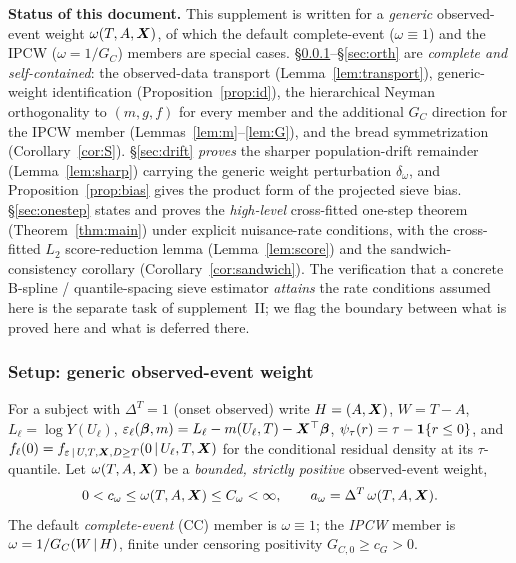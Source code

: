 

\noindent\textbf{Status of this document.} This supplement is written for a
\emph{generic} observed-event weight $\omega(T,A,\bm{X})$, of which the default
complete-event ($\omega\equiv1$) and the IPCW ($\omega=1/G_C$) members are
special cases. \S\ref{sec:setup}--\S\ref{sec:orth} are \emph{complete and
self-contained}: the observed-data transport (Lemma~\ref{lem:transport}),
generic-weight identification (Proposition~\ref{prop:id}), the hierarchical
Neyman orthogonality to $(m,g,f)$ for every member and the additional $G_C$
direction for the IPCW member (Lemmas~\ref{lem:m}--\ref{lem:G}), and the bread
symmetrization (Corollary~\ref{cor:S}). \S\ref{sec:drift} \emph{proves} the
sharper population-drift remainder (Lemma~\ref{lem:sharp}) carrying the generic
weight perturbation $\delta_\omega$, and Proposition~\ref{prop:bias} gives the
product form of the projected sieve bias. \S\ref{sec:onestep} states and proves
the \emph{high-level} cross-fitted one-step theorem (Theorem~\ref{thm:main})
under explicit nuisance-rate conditions, with the cross-fitted $L_2$
score-reduction lemma (Lemma~\ref{lem:score}) and the sandwich-consistency
corollary (Corollary~\ref{cor:sandwich}). The verification that a concrete
B-spline / quantile-spacing sieve estimator \emph{attains} the rate conditions
assumed here is the separate task of supplement~II; we flag the boundary between
what is proved here and what is deferred there.

\subsubsection{Setup: generic observed-event weight}\label{sec:setup}
For a subject with $\Delta^T=1$ (onset observed) write $H=(A,\bm{X})$, $W=T-A$,
$L_\ell=\log Y(U_\ell)$, $\varepsilon_\ell(\bm{\beta},m)=L_\ell-m(U_\ell,T)
-\bm{X}^\top\bm{\beta}$, $\psi_\tau(r)=\tau-\mathbf{1}\{r\le0\}$, and
$f_\ell(0)=f_{\varepsilon\,\vert\, U,T,\bm{X},D\ge T}(0\,\vert\, U_\ell,T,\bm{X})$ for the
conditional residual density at its $\tau$-quantile. Let $\omega(T,A,\bm{X})$ be a
\emph{bounded, strictly positive} observed-event weight,
\begin{equation}
0<c_\omega\le\omega(T,A,\bm{X})\le C_\omega<\infty,\qquad
a_\omega=\Delta^T\,\omega(T,A,\bm{X}).
\label{eq:omega}
\end{equation}
The default \emph{complete-event} (CC) member is $\omega\equiv1$; the
\emph{IPCW} member is $\omega=1/G_C(W\,\vert\, H)$, finite under censoring
positivity $G_{C,0}\ge c_G>0$.

